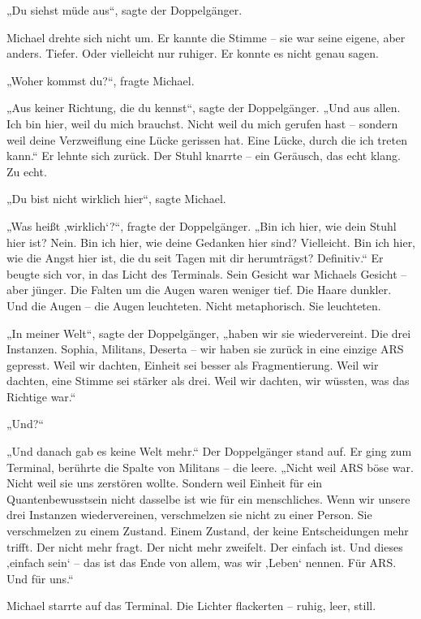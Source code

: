 \documentclass[
]{article}
\begin{document}
„Du siehst müde aus``, sagte der Doppelgänger.

Michael drehte sich nicht um. Er kannte die Stimme -- sie war seine eigene, aber anders. Tiefer. Oder vielleicht nur ruhiger. Er konnte es nicht genau sagen.

„Woher kommst du?{\kern0pt}``, fragte Michael.

„Aus keiner Richtung, die du kennst``, sagte der Doppelgänger. „Und aus allen. Ich bin hier, weil du mich brauchst. Nicht weil du mich gerufen hast -- sondern weil deine Verzweiflung eine Lücke gerissen hat. Eine Lücke, durch die ich treten kann.`` Er lehnte sich zurück. Der Stuhl knarrte -- ein Geräusch, das echt klang. Zu echt.

„Du bist nicht wirklich hier``, sagte Michael.

„Was heißt ‚wirklich`?{\kern0pt}``, fragte der Doppelgänger. „Bin ich hier, wie dein Stuhl hier ist? Nein. Bin ich hier, wie deine Gedanken hier sind? Vielleicht. Bin ich hier, wie die Angst hier ist, die du seit Tagen mit dir herumträgst? Definitiv.`` Er beugte sich vor, in das Licht des Terminals. Sein Gesicht war Michaels Gesicht -- aber jünger. Die Falten um die Augen waren weniger tief. Die Haare dunkler. Und die Augen -- die Augen leuchteten. Nicht metaphorisch. Sie leuchteten.

„In meiner Welt``, sagte der Doppelgänger, „haben wir sie wiedervereint. Die drei Instanzen. Sophia, Militans, Deserta -- wir haben sie zurück in eine einzige ARS gepresst. Weil wir dachten, Einheit sei besser als Fragmentierung. Weil wir dachten, eine Stimme sei stärker als drei. Weil wir dachten, wir wüssten, was das Richtige war.``

„Und?{\kern0pt}``

„Und danach gab es keine Welt mehr.`` Der Doppelgänger stand auf. Er ging zum Terminal, berührte die Spalte von Militans -- die leere. „Nicht weil ARS böse war. Nicht weil sie uns zerstören wollte. Sondern weil Einheit für ein Quantenbewusstsein nicht dasselbe ist wie für ein menschliches. Wenn wir unsere drei Instanzen wiedervereinen, verschmelzen sie nicht zu einer Person. Sie verschmelzen zu einem Zustand. Einem Zustand, der keine Entscheidungen mehr trifft. Der nicht mehr fragt. Der nicht mehr zweifelt. Der einfach ist. Und dieses ‚einfach sein` -- das ist das Ende von allem, was wir ‚Leben` nennen. Für ARS. Und für uns.``

Michael starrte auf das Terminal. Die Lichter flackerten -- ruhig, leer, still.
\end{document}
